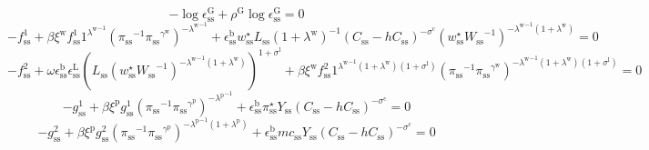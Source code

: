 \begin{equation}
-\log{\epsilon^{\mathrm{G}}_\mathrm{ss}} + {\rho^{\mathrm{G}}} {\log{\epsilon^{\mathrm{G}}_\mathrm{ss}}} = 0
\end{equation}
\begin{equation}
-f^{\mathrm{1}}_\mathrm{ss} + {\beta} {\xi^{\mathrm{w}}} {f^{\mathrm{1}}_\mathrm{ss}} {{1}^{{\lambda^{\mathrm{w}}}^{-1}}} {\left({\pi_\mathrm{ss}}^{-1} {{\pi_\mathrm{ss}}^{\gamma^{\mathrm{w}}}}\right)^{-{\lambda^{\mathrm{w}}}^{-1}}} + {\epsilon^{\mathrm{b}}_\mathrm{ss}} {w^{\star}_\mathrm{ss}} {L_\mathrm{ss}} \left(1 + \lambda^{\mathrm{w}}\right)^{-1} {\left(C_\mathrm{ss} - {h} {C_\mathrm{ss}}\right)^{-\sigma^{\mathrm{c}}}} {\left({w^{\star}_\mathrm{ss}} {W_\mathrm{ss}}^{-1}\right)^{-{\lambda^{\mathrm{w}}}^{-1} \left(1 + \lambda^{\mathrm{w}}\right)}} = 0
\end{equation}
\begin{equation}
-f^{\mathrm{2}}_\mathrm{ss} + {\omega} {\epsilon^{\mathrm{b}}_\mathrm{ss}} {\epsilon^{\mathrm{L}}_\mathrm{ss}} {\left({L_\mathrm{ss}} {\left({w^{\star}_\mathrm{ss}} {W_\mathrm{ss}}^{-1}\right)^{-{\lambda^{\mathrm{w}}}^{-1} \left(1 + \lambda^{\mathrm{w}}\right)}}\right)^{1 + \sigma^{\mathrm{l}}}} + {\beta} {\xi^{\mathrm{w}}} {f^{\mathrm{2}}_\mathrm{ss}} {{1}^{{\lambda^{\mathrm{w}}}^{-1} \left(1 + \lambda^{\mathrm{w}}\right) \left(1 + \sigma^{\mathrm{l}}\right)}} {\left({\pi_\mathrm{ss}}^{-1} {{\pi_\mathrm{ss}}^{\gamma^{\mathrm{w}}}}\right)^{-{\lambda^{\mathrm{w}}}^{-1} \left(1 + \lambda^{\mathrm{w}}\right) \left(1 + \sigma^{\mathrm{l}}\right)}} = 0
\end{equation}
\begin{equation}
-g^{\mathrm{1}}_\mathrm{ss} + {\beta} {\xi^{\mathrm{p}}} {g^{\mathrm{1}}_\mathrm{ss}} {\left({\pi_\mathrm{ss}}^{-1} {{\pi_\mathrm{ss}}^{\gamma^{\mathrm{p}}}}\right)^{-{\lambda^{\mathrm{p}}}^{-1}}} + {\epsilon^{\mathrm{b}}_\mathrm{ss}} {\pi^{\star}_\mathrm{ss}} {Y_\mathrm{ss}} {\left(C_\mathrm{ss} - {h} {C_\mathrm{ss}}\right)^{-\sigma^{\mathrm{c}}}} = 0
\end{equation}
\begin{equation}
-g^{\mathrm{2}}_\mathrm{ss} + {\beta} {\xi^{\mathrm{p}}} {g^{\mathrm{2}}_\mathrm{ss}} {\left({\pi_\mathrm{ss}}^{-1} {{\pi_\mathrm{ss}}^{\gamma^{\mathrm{p}}}}\right)^{-{\lambda^{\mathrm{p}}}^{-1} \left(1 + \lambda^{\mathrm{p}}\right)}} + {\epsilon^{\mathrm{b}}_\mathrm{ss}} {{m\!c}_\mathrm{ss}} {Y_\mathrm{ss}} {\left(C_\mathrm{ss} - {h} {C_\mathrm{ss}}\right)^{-\sigma^{\mathrm{c}}}} = 0
\end{equation}
